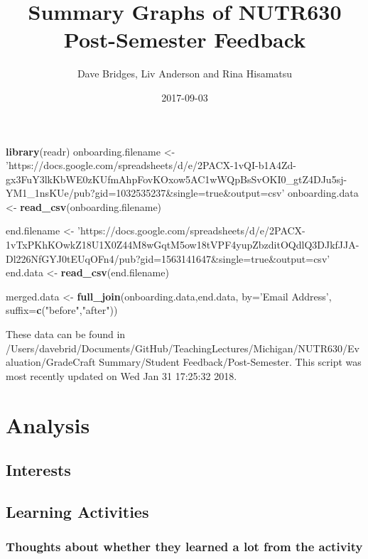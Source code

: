 \documentclass[]{article}
\title{Summary Graphs of NUTR630 Post-Semester Feedback}
\author{Dave Bridges, Liv Anderson and Rina Hisamatsu}
\date{2017-09-03}
\newenvironment{Shaded}{\begin{snugshade}}{\end{snugshade}}
\newcommand{\KeywordTok}[1]{\textcolor[rgb]{0.13,0.29,0.53}{\textbf{{#1}}}}
\newcommand{\DataTypeTok}[1]{\textcolor[rgb]{0.13,0.29,0.53}{{#1}}}
\newcommand{\StringTok}[1]{\textcolor[rgb]{0.31,0.60,0.02}{{#1}}}
\newcommand{\NormalTok}[1]{{#1}}
\begin{document}
\maketitle

{
\setcounter{tocdepth}{2}
\tableofcontents
}
\begin{Shaded}
\begin{Highlighting}[]
\KeywordTok{library}\NormalTok{(readr)}
\NormalTok{onboarding.filename <-}\StringTok{ 'https://docs.google.com/spreadsheets/d/e/2PACX-1vQI-b1A4Zd-gx3FuY3lkKbWE0zKUfmAhpFovKOxow5AC1wWQpBsSvOKI0_gtZ4DJu5sj-YM1_1nsKUe/pub?gid=1032535237&single=true&output=csv'}
\NormalTok{onboarding.data <-}\StringTok{ }\KeywordTok{read_csv}\NormalTok{(onboarding.filename)}

\NormalTok{end.filename <-}\StringTok{ 'https://docs.google.com/spreadsheets/d/e/2PACX-1vTxPKhKOwkZ18U1X0Z44M8wGqtM5ow18tVPF4yupZbzditOQdlQ3DJkfJJA-Dl226NfGYJ0tEUqOFn4/pub?gid=1563141647&single=true&output=csv'}
\NormalTok{end.data <-}\StringTok{ }\KeywordTok{read_csv}\NormalTok{(end.filename)}

\NormalTok{merged.data <-}\StringTok{ }\KeywordTok{full_join}\NormalTok{(onboarding.data,end.data, }\DataTypeTok{by=}\StringTok{'Email Address'}\NormalTok{, }\DataTypeTok{suffix=}\KeywordTok{c}\NormalTok{(}\StringTok{"before"}\NormalTok{,}\StringTok{"after"}\NormalTok{))}
\end{Highlighting}
\end{Shaded}

These data can be found in
/Users/davebrid/Documents/GitHub/TeachingLectures/Michigan/NUTR630/Evaluation/GradeCraft
Summary/Student Feedback/Post-Semester. This script was most recently
updated on Wed Jan 31 17:25:32 2018.

\section{Analysis}\label{analysis}

\subsection{Interests}\label{interests}

\subsection{Learning Activities}\label{learning-activities}

\subsubsection{Thoughts about whether they learned a lot from the
activity}\label{thoughts-about-whether-they-learned-a-lot-from-the-activity}
\end{document}
